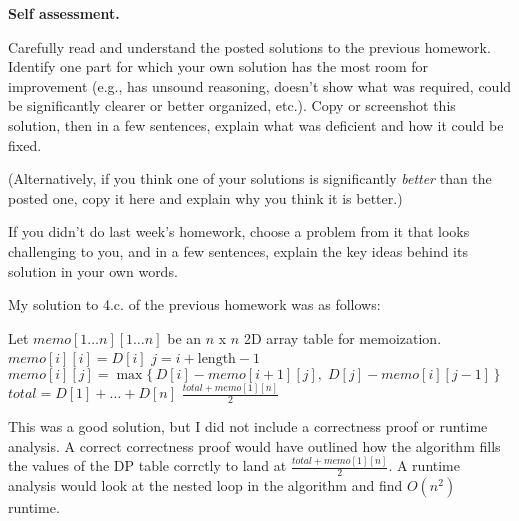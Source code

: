\documentclass[11pt,addpoints,answers]{exam}
\begin{document}
\hwpreface

\begin{questions}

  \question[10] \textbf{Self assessment.} \nopagebreak
  
  Carefully read and understand the posted solutions to the previous homework.
  Identify one part for which your own solution has the most room for improvement (e.g., has unsound reasoning, doesn’t show what was required, could be significantly clearer or better organized, etc.).
  Copy or screenshot this solution, then in a few sentences, explain what was deficient and how it could be fixed.

  (Alternatively, if you think one of your solutions is significantly \emph{better} than the posted one, copy it here and explain why you think it is better.)

  If you didn't do last week's homework, choose a problem from it that looks challenging to you, and in a few sentences, explain the key ideas behind its solution in your own words.

  \begin{solution} 
  
  My solution to 4.c. of the previous homework was as follows: 

  \begin{algorithm}[H]
    \begin{algorithmic}[1]
          \State Let $memo[1\ldots n][1\ldots n]$ be an $n$ x $n$ 2D array table for memoization.
              \State $memo[i][i] = D[i]$ 
          \EndFor
          \medskip
                  \State $j = i + \text{length} - 1$
                  \State $memo[i][j] = \max\{\,D[i] - memo[i+1][j],\; D[j] - memo[i][j-1]\,\}$
              \EndFor
          \EndFor
          \medskip
          \State $total = D[1] + \dots + D[n]$
          \State \Return $\displaystyle \frac{total + memo[1][n]}{2}$
        \EndFunction
    \end{algorithmic}
  \end{algorithm}

  This was a good solution, but I did not include a correctness proof or runtime analysis. A correct correctness proof would have outlined how the algorithm fills the values of the DP table corrctly to land at $\frac{total + memo[1][n]}{2}$. A runtime analysis would look at the nested loop in the algorithm and find $O(n^2)$ runtime.
  \end{solution}


\end{questions}
\end{document}

